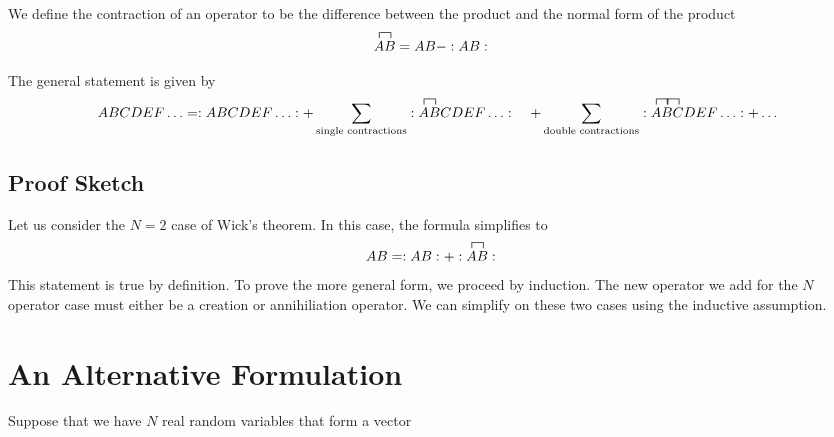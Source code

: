 \documentclass[book.tex]{subfiles}
\begin{document}
We define the contraction of an operator to be the difference between the product and the normal form of the product %
\begin{align}
\contraction{}{A}{}{B} AB &= AB - :AB:
\end{align}

The general statement is given by
\begin{align}
    ABCDEF\dotsc &= :ABCDEF \dotsc : + \sum_{\textrm{single contractions}} :\contraction{}{A}{}{B} ABCDEF\dotsc : \
    &+ \sum_{\textrm{double contractions}} :\contraction{}{A}{}{B}
    \contraction{A}{B}{}{C}
    ABCDEF\dotsc : + \dotsc 
\end{align}
\subsection{Proof Sketch}
Let us consider the $N=2$ case of Wick's theorem. In this case, the formula simplifies to
\begin{align}
    AB &= :AB: + :\contraction{}{A}{}{B} AB:
\end{align}
This statement is true by definition. To prove the more general form, we proceed by induction. The new operator we add for the $N$ operator case must either be a creation or annihiliation operator. We can simplify on these two cases using the inductive assumption.

\section{An Alternative Formulation}

Suppose that we have $N$ real random variables that form a vector 
\end{document}
